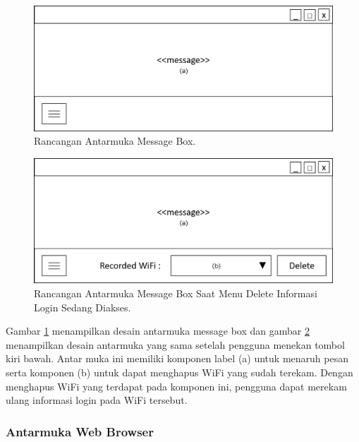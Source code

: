 \begin{figure}[!htb]
    \centering
    \includegraphics[scale=0.4]{Gambar/UI_MessageBox_Hidden.png}
    \caption[Rancangan Antarmuka Message Box.]{Rancangan Antarmuka Message Box.}
    \label{fig:RancanganAntarmukaMessageBox}
\end{figure}

\begin{figure}[!htb]
    \centering
    \includegraphics[scale=0.4]{Gambar/UI_MessageBox.png}
    \caption[Rancangan Antarmuka Message Box Saat Menu Delete Informasi Login Sedang Diakses.]{Rancangan Antarmuka Message Box Saat Menu Delete Informasi Login Sedang Diakses.}
    \label{fig:RancanganAntarmukaMessageBoxShown}
\end{figure}

Gambar \ref{fig:RancanganAntarmukaMessageBox} menampilkan desain antarmuka message box dan gambar \ref{fig:RancanganAntarmukaMessageBoxShown} menampilkan desain antarmuka yang sama setelah pengguna menekan tombol kiri bawah. Antar muka ini memiliki komponen label (a) untuk menaruh pesan serta komponen (b) untuk dapat menghapus WiFi yang sudah terekam. Dengan menghapus WiFi yang terdapat pada komponen ini, pengguna dapat merekam ulang informasi login pada WiFi tersebut.

\subsubsection{Antarmuka Web Browser}
\label{subsec:antarmuka_web_browser}

